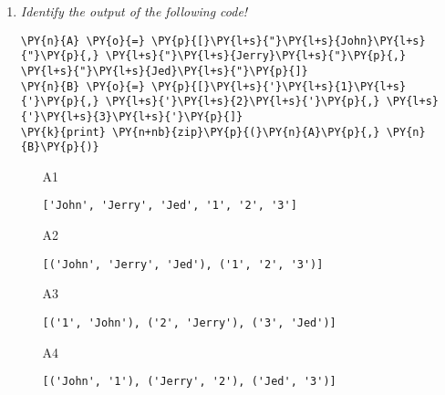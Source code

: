 \begin{enumerate}
\begin{enumerate}
\item[A1] 
\begin{verbatim}
1
\end{verbatim}
\item[A2] 
\begin{verbatim}
(1, -1)
\end{verbatim}
\item[A3] 
\begin{verbatim}
(1, 4)
\end{verbatim}
\item[A4] 
\begin{verbatim}
(2, 5)
\end{verbatim}
\end{enumerate}

\vspace{6mm}

\item {\em Identify the output of the following code!}\\

\begin{Verbatim}[commandchars=\\\{\}]
\PY{n}{A} \PY{o}{=} \PY{p}{[}\PY{l+s}{"}\PY{l+s}{John}\PY{l+s}{"}\PY{p}{,} \PY{l+s}{"}\PY{l+s}{Jerry}\PY{l+s}{"}\PY{p}{,} \PY{l+s}{"}\PY{l+s}{Jed}\PY{l+s}{"}\PY{p}{]}
\PY{n}{B} \PY{o}{=} \PY{p}{[}\PY{l+s}{'}\PY{l+s}{1}\PY{l+s}{'}\PY{p}{,} \PY{l+s}{'}\PY{l+s}{2}\PY{l+s}{'}\PY{p}{,} \PY{l+s}{'}\PY{l+s}{3}\PY{l+s}{'}\PY{p}{]}
\PY{k}{print} \PY{n+nb}{zip}\PY{p}{(}\PY{n}{A}\PY{p}{,} \PY{n}{B}\PY{p}{)}
\end{Verbatim}
\vspace{6mm}

\begin{enumerate}
\item[A1] 
\begin{verbatim}
['John', 'Jerry', 'Jed', '1', '2', '3']
\end{verbatim}
\item[A2] 
\begin{verbatim}
[('John', 'Jerry', 'Jed'), ('1', '2', '3')]
\end{verbatim}
\item[A3] 
\begin{verbatim}
[('1', 'John'), ('2', 'Jerry'), ('3', 'Jed')]
\end{verbatim}
\item[A4] 
\begin{verbatim}
[('John', '1'), ('Jerry', '2'), ('Jed', '3')]
\end{verbatim}
\end{enumerate}


\end{enumerate}
